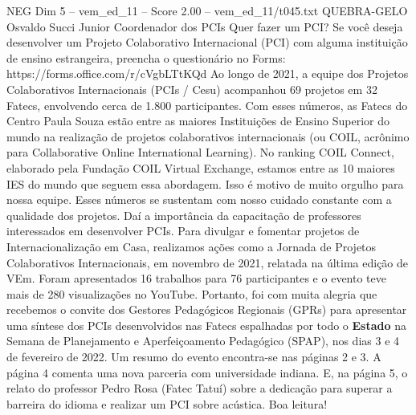 \begin{textsample}{NEG Dim 5 – vem\_ed\_11 – Score 2.00 – vem\_ed\_11/t045.txt}  \label{ex:f5_neg_057}
QUEBRA-GELO Osvaldo Succi Junior Coordenador dos PCIs Quer fazer um PCI?
Se você deseja desenvolver um Projeto Colaborativo Internacional (PCI) com alguma instituição de ensino estrangeira, preencha o questionário no Forms: https://forms.office.com/r/cVgbLTtKQd Ao longo de 2021, a equipe dos Projetos Colaborativos Internacionais (PCIs / Cesu) acompanhou 69 projetos em 32 Fatecs, envolvendo cerca de 1.800 participantes.
Com esses números, as Fatecs do Centro Paula Souza estão entre as maiores Instituições de Ensino Superior do mundo na realização de projetos colaborativos internacionais (ou COIL, acrônimo para Collaborative Online International Learning).
No ranking COIL Connect, elaborado pela Fundação COIL Virtual Exchange, estamos entre as 10 maiores IES do mundo que seguem essa abordagem.
Isso é motivo de muito orgulho para nossa equipe.
Esses números se sustentam com nosso cuidado constante com a qualidade dos projetos.
Daí a importância da capacitação de professores interessados em desenvolver PCIs.
Para divulgar e fomentar projetos de Internacionalização em Casa, realizamos ações como a Jornada de Projetos Colaborativos Internacionais, em novembro de 2021, relatada na última edição de VEm.
Foram apresentados 16 trabalhos para 76 participantes e o evento teve mais de 280 visualizações no YouTube.
Portanto, foi com muita alegria que recebemos o convite dos Gestores Pedagógicos Regionais (GPRs) para apresentar uma síntese dos PCIs desenvolvidos nas Fatecs espalhadas por todo o \textbf{Estado} na Semana de Planejamento e Aperfeiçoamento Pedagógico (SPAP), nos dias 3 e 4 de fevereiro de 2022.
Um resumo do evento encontra-se nas páginas 2 e 3.
A página 4 comenta uma nova parceria com universidade indiana.
E, na página 5, o relato do professor Pedro Rosa (Fatec Tatuí) sobre a dedicação para superar a barreira do idioma e realizar um PCI sobre acústica.
Boa leitura!

\end{textsample}
